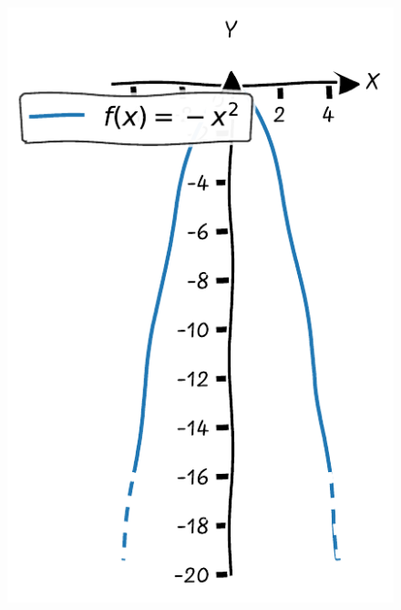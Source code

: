 \documentclass{tufte-handout}
\begin{document}
\begin{figure}[h]
\begin{minipage}{0.21\textwidth}
    \includegraphics[width=\linewidth]{./graphs/quadratic_func_flipped.pdf}
    \label{fig:third}
  \end{minipage}\hfill
  \begin{minipage}{0.21\textwidth}

\end{minipage}
\end{figure}
\end{document}
